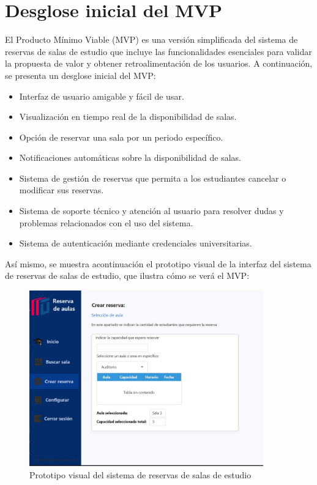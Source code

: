 \documentclass{article}
\begin{document}
      \section{Desglose inicial del MVP}

      El Producto Mínimo Viable (MVP) es una versión simplificada del sistema de reservas de salas de estudio que incluye las funcionalidades esenciales para validar la propuesta de valor y obtener retroalimentación de los usuarios. A continuación, se presenta un desglose inicial del MVP:

      \begin{itemize}
        \item Interfaz de usuario amigable y fácil de usar.
        \item Visualización en tiempo real de la disponibilidad de salas.
        \item Opción de reservar una sala por un periodo específico.
        \item Notificaciones automáticas sobre la disponibilidad de salas.
        \item Sistema de gestión de reservas que permita a los estudiantes cancelar o modificar sus reservas.
        \item Sistema de soporte técnico y atención al usuario para resolver dudas y problemas relacionados con el uso del sistema.
        \item Sistema de autenticación mediante credenciales universitarias.
      \end{itemize}

      Así mismo, se muestra acontinuación el prototipo visual de la interfaz del sistema de reservas de salas de estudio, que ilustra cómo se verá el MVP:
      \begin{figure}[ht]
        \centering
        \includegraphics[width=0.9\textwidth]{assets/proto.jpeg}
        \caption{Prototipo visual del sistema de reservas de salas de estudio}
        \label{fig:prototipo}
      \end{figure}
      \newpage
\end{document}
